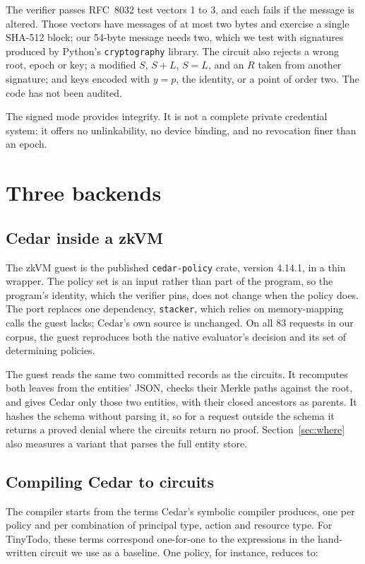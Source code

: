 \documentclass[11pt]{article}
\begin{document}
The verifier passes RFC~8032 test vectors 1 to 3, and each fails if the message is altered. Those vectors have messages of at most two bytes and exercise a single SHA-512 block; our 54-byte message needs two, which we test with signatures produced by Python's \texttt{cryptography} library. The circuit also rejects a wrong root, epoch or key; a modified $S$, $S+L$, $S = L$, and an $R$ taken from another signature; and keys encoded with $y = p$, the identity, or a point of order two. The code has not been audited.

The signed mode provides integrity. It is not a complete private credential system: it offers no unlinkability, no device binding, and no revocation finer than an epoch.

\section{Three backends}

\subsection{Cedar inside a zkVM}

The zkVM guest is the published \texttt{cedar-policy} crate, version 4.14.1, in a thin wrapper. The policy set is an input rather than part of the program, so the program's identity, which the verifier pins, does not change when the policy does. The port replaces one dependency, \texttt{stacker}, which relies on memory-mapping calls the guest lacks; Cedar's own source is unchanged. On all 83 requests in our corpus, the guest reproduces both the native evaluator's decision and its set of determining policies.

The guest reads the same two committed records as the circuits. It recomputes both leaves from the entities' JSON, checks their Merkle paths against the root, and gives Cedar only those two entities, with their closed ancestors as parents. It hashes the schema without parsing it, so for a request outside the schema it returns a proved denial where the circuits return no proof. Section~\ref{sec:where} also measures a variant that parses the full entity store.

\subsection{Compiling Cedar to circuits}
\label{sec:compiler}

The compiler starts from the terms Cedar's symbolic compiler produces, one per policy and per combination of principal type, action and resource type. For TinyTodo, these terms correspond one-for-one to the expressions in the hand-written circuit we use as a baseline. One policy, for instance, reduces to:
\end{document}
